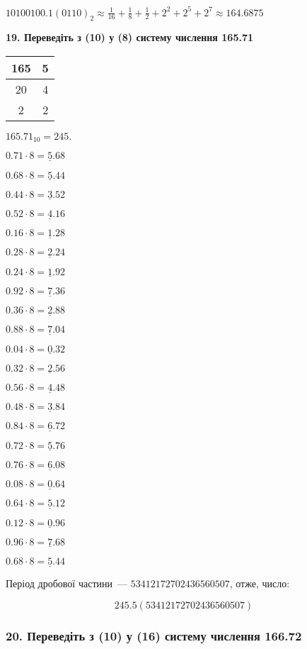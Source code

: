\documentclass[14pt]{extreport}
\begin{document}
$10100100.1(0110)_2\approx\frac{1}{16}+\frac{1}{8}+\frac{1}{2}
+2^2+2^5+2^7\approx{164.6875}$

\newpage
\noindent\textbf{19.  Переведіть з (10) у (8) систему числення 165.71}
\begin{multicols}{3}
\begin{tabular}{c|c}
	165 & 5 \\
	\hline
	20 & 4 \\
	\hline
	2 & 2 \\
\end{tabular}

\bigskip
$165.71_{10}=245.$

$0.71\cdot8=\underline{5}.68$

$0.68\cdot8=\underline{5}.44$

$0.44\cdot8=\underline{3}.52$

$0.52\cdot8=\underline{4}.16$

$0.16\cdot8=\underline{1}.28$

$0.28\cdot8=\underline{2}.24$

$0.24\cdot8=\underline{1}.92$

$0.92\cdot8=\underline{7}.36$

$0.36\cdot8=\underline{2}.88$

$0.88\cdot8=\underline{7}.04$

$0.04\cdot8=\underline{0}.32$

$0.32\cdot8=\underline{2}.56$

$0.56\cdot8=\underline{4}.48$

$0.48\cdot8=\underline{3}.84$

$0.84\cdot8=\underline{6}.72$

$0.72\cdot8=\underline{5}.76$

$0.76\cdot8=\underline{6}.08$

$0.08\cdot8=\underline{0}.64$

$0.64\cdot8=\underline{5}.12$

$0.12\cdot8=\underline{0}.96$

$0.96\cdot8=\underline{7}.68$

$0.68\cdot8=\underline{5}.44$

\end{multicols}

Період дробової частини~--- $53412172702436560507$, отже, число:

$$245.5(53412172702436560507)$$

\subsubsection{20.  Переведіть з (10) у  (16)  систему числення 166.72}
\end{document}
